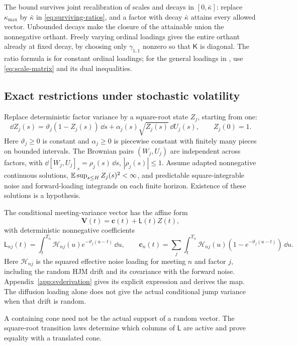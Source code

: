 The bound survives joint recalibration of scales and decays in $[0,\bar\kappa]$: replace $\kappa_{\max}$ by $\bar\kappa$ in \eqref{eq:surviving-ratios}, and a factor with decay $\bar\kappa$ attains every allowed vector. Unbounded decays make the closure of the attainable union the nonnegative orthant. Freely varying ordinal loadings gives the entire orthant already at fixed decay, by choosing only $\gamma_{1,1}$ nonzero so that $\mathsf K$ is diagonal. The ratio formula is for constant ordinal loadings; for the general loadings in \citet{brace2024sofr}, use \eqref{eq:scale-matrix} and its dual inequalities.

\subsection{Exact restrictions under stochastic volatility}
Replace deterministic factor variance by a square-root state $Z_j$, starting from one:
\begin{equation}\label{eq:svstate}
\dd Z_j(s)=\vartheta_j(1-Z_j(s))\,\dd s
                +\alpha_j(s)\sqrt{Z_j(s)}\,\dd U_j(s),\qquad Z_j(0)=1.
\end{equation}
Here $\vartheta_j\geq0$ is constant and $\alpha_j\geq0$ is piecewise constant with finitely many pieces on bounded intervals. The Brownian pairs $(W_j,U_j)$ are independent across factors, with $\dd[W_j,U_j]_s=\rho_j(s)\,\dd s$, $|\rho_j(s)|\leq1$. Assume adapted nonnegative continuous solutions, $\mathbb E\sup_{s\leq H}Z_j(s)^2<\infty$, and predictable square-integrable noise and forward-loading integrands on each finite horizon. Existence of these solutions is a hypothesis.

The conditional meeting-variance vector has the affine form
\begin{equation}\label{eq:svmap}
\boldsymbol V(t)=\boldsymbol c(t)+\mathsf L(t)Z(t),
\end{equation}
with deterministic nonnegative coefficients
\[
\mathsf L_{nj}(t)=\int_t^{T_n}\mathcal H_{nj}(u)e^{-\vartheta_j(u-t)}\,\dd u,
\qquad
\boldsymbol c_n(t)=\sum_j\int_t^{T_n}\mathcal H_{nj}(u)(1-e^{-\vartheta_j(u-t)})\,\dd u.
\]
Here $\mathcal H_{nj}$ is the squared effective noise loading for meeting $n$ and factor $j$, including the random HJM drift and its covariance with the forward noise. Appendix~\ref{app:svderivation} gives its explicit expression and derives the map. The diffusion loading alone does not give the actual conditional jump variance when that drift is random.

A containing cone need not be the actual support of a random vector. The square-root transition laws determine which columns of $\mathsf L$ are active and prove equality with a translated cone.

